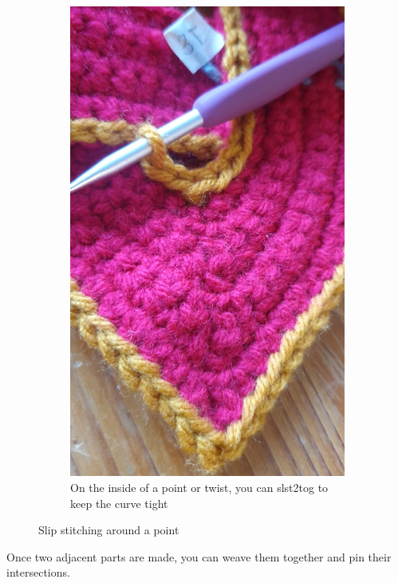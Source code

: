 \documentclass[openany]{book}
\begin{document}
\begin{figure}[H]
\begin{subfigure}[t]{.3\textwidth}
		\includegraphics[width=.95\textwidth]{bk/inside}
\caption{On the inside of a point or twist, you can slst2tog to keep the curve tight}
\end{subfigure}
\caption{Slip stitching around a point}
\end{figure}

Once two adjacent parts are made, you can weave them together and pin their intersections.
\end{document}
